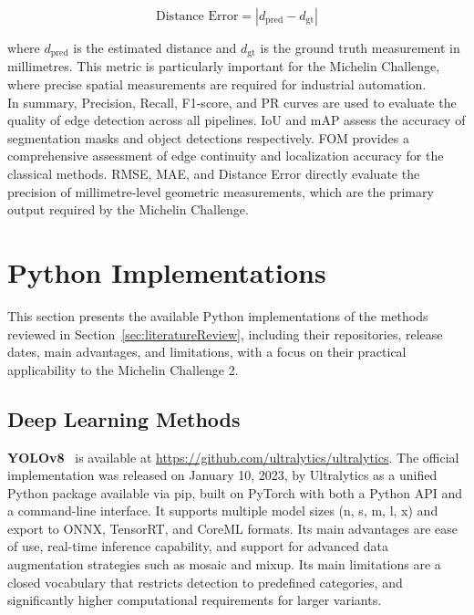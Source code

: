 \documentclass[11pt]{article}
\begin{document}
\[
\text{Distance Error} = | d_{\text{pred}} - d_{\text{gt}} |
\]

where $d_{\text{pred}}$ is the estimated distance and $d_{\text{gt}}$ is the 
ground truth measurement in millimetres. This metric is particularly important 
for the Michelin Challenge, where precise spatial measurements are required for 
industrial automation.\\

In summary, Precision, Recall, F1-score, and PR curves are used to evaluate the 
quality of edge detection across all pipelines. IoU and mAP assess the accuracy 
of segmentation masks and object detections respectively. FOM provides a 
comprehensive assessment of edge continuity and localization accuracy for the 
classical methods. RMSE, MAE, and Distance Error directly evaluate the precision 
of millimetre-level geometric measurements, which are the primary output required 
by the Michelin Challenge.

\section{Python Implementations}
\label{sec:python}

This section presents the available Python implementations of the methods reviewed 
in Section~\ref{sec:literatureReview}, including their repositories, release dates, 
main advantages, and limitations, with a focus on their practical applicability to 
the Michelin Challenge 2.

\subsection{Deep Learning Methods}

\textbf{YOLOv8}~\cite{Jocher2023YOLOv8} is available at 
\url{https://github.com/ultralytics/ultralytics}. The official implementation was 
released on January 10, 2023, by Ultralytics as a unified Python package available 
via pip, built on PyTorch with both a Python API and a command-line interface. It 
supports multiple model sizes (n, s, m, l, x) and export to ONNX, TensorRT, and 
CoreML formats. Its main advantages are ease of use, real-time inference capability, 
and support for advanced data augmentation strategies such as mosaic and mixup. Its 
main limitations are a closed vocabulary that restricts detection to predefined 
categories, and significantly higher computational requirements for larger variants.\\
\end{document}
